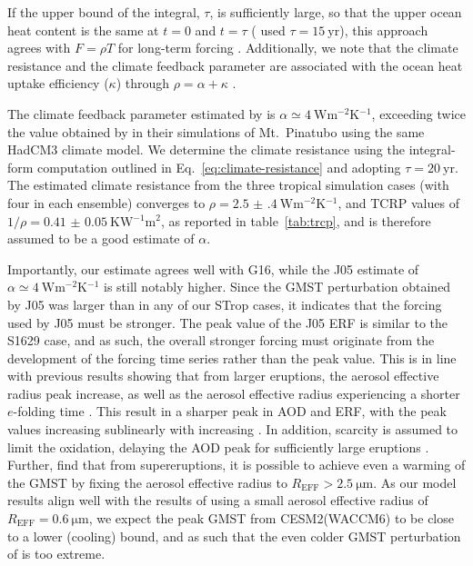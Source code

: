 \documentclass[draft]{agujournal2019}
\begin{document}
  If the upper bound of the integral, \(\tau\), is sufficiently large, so that the upper
  ocean heat content is the same at \(t=0\) and \(t=\tau\) ( used
  \(\tau =\SI{15}{\mathrm{yr}}\)), this approach agrees with \(F=\rho T\) for long-term
  forcing \cite{gregory2016}. Additionally, we note that the climate resistance and the
  climate feedback parameter are associated with the ocean heat uptake efficiency
  (\(\kappa\)) through \(\rho =\alpha +\kappa\) \cite{gregory2016}.

  The climate feedback parameter estimated by  is \(\alpha \simeq
  \SI{4}{\watt\metre^{-2}\kelvin^{-1}}\), exceeding twice the value obtained by
   in their simulations of Mt.\ Pinatubo using the same HadCM3
  climate model. We determine the climate resistance using the integral-form computation
  outlined in Eq.~\ref{eq:climate-resistance} and adopting \(\tau
  =\SI{20}{\mathrm{yr}}\). The estimated climate resistance from the three tropical
  simulation cases (with four in each ensemble) converges to \(\rho
  =\SI{2.5(4)}{\watt\metre^{-2}\kelvin^{-1}}\), and TCRP values of
  \(1/\rho=\SI{0.41(5)}{\kelvin\watt^{-1}\metre^{2}}\), as reported in
  table~\ref{tab:trcp}, and is therefore assumed to be a good estimate of \(\alpha\).

  Importantly, our estimate agrees well with G16, while the J05 estimate of \(\alpha
  \simeq \SI{4}{\watt\metre^{-2}\kelvin^{-1}}\) is still notably higher. Since the GMST
  perturbation obtained by J05 was larger than in any of our STrop cases, it indicates
  that the forcing used by J05 must be stronger. The peak value of the J05 ERF is
  similar to the S1629 case, and as such, the overall stronger forcing must originate
  from the development of the forcing time series rather than the peak value. This is in
  line with previous results showing that from larger eruptions, the aerosol effective
  radius peak increase, as well as the aerosol effective radius experiencing a shorter
  \(e\)-folding time \cite{clyne2021}. This result in a sharper peak in AOD and ERF,
  with the peak values increasing sublinearly with increasing 
  \cite{english2013,timmreck2009,zanchettin2016,clyne2021}. In addition, 
  scarcity is assumed to limit the  oxidation, delaying the AOD peak for
  sufficiently large eruptions \cite{timmreck2010}. Further,  find
  that from supereruptions, it is possible to achieve even a warming of the GMST by
  fixing the aerosol effective radius to \(R_{\mathrm{EFF}}>\SI{2.5}{\micro\meter}\). As
  our model results align well with the results of  using a small
  aerosol effective radius of \(R_{\mathrm{EFF}}=\SI{0.6}{\micro\meter}\), we expect the
  peak GMST from CESM2(WACCM6) to be close to a lower (cooling) bound, and as such that
  the even colder GMST perturbation of  is too extreme.
\end{document}
